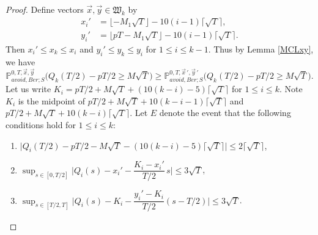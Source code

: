 \begin{proof}
	Define vectors $\vec{x},\vec{y}\in\mathfrak{W}_k$ by
	\begin{align*}
	x_i' &= \lfloor - M_1\sqrt{T} \rfloor - 10(i-1)\lceil\sqrt{T}\rceil,\\
	y_i' &= \lfloor pT - M_1\sqrt{T}\rfloor - 10(i-1)\lceil\sqrt{T}\rceil.
	\end{align*}
	Then $x_i'\leq x_k \leq x_i$ and $y_i' \leq y_k \leq y_i$ for $1\leq i\leq k-1$. Thus by Lemma \ref{MCLxy}, we have
	\begin{equation*}
	\mathbb{P}^{0,T,\vec{x},\vec{y}}_{avoid, Ber; S} \Big(Q_k(T/2) - pT/2 \geq M\sqrt{T}\Big) \geq \mathbb{P}^{0,T,\vec{x}\,',\vec{y}\,'}_{avoid, Ber; S} \Big(Q_k(T/2) - pT/2 \geq M\sqrt{T}\Big).
	\end{equation*}
	Let us write $K_i = pT/2 + M\sqrt{T}+(10(k-i)-5)\lceil\sqrt{T}\rceil$ for $1\leq i\leq k$. Note $K_i$ is the midpoint of $pT/2 + M\sqrt{T} + 10(k-i-1)\lceil\sqrt{T}\rceil$ and $pT/2 + M\sqrt{T}+10(k-i)\lceil\sqrt{T}\rceil$. Let $E$ denote the event that the following conditions hold for $1\leq i\leq k$:
	\begin{enumerate}[label=(\arabic*)]
		
		\item $\big| Q_i(T/2) - pT/2 - M\sqrt{T} - (10(k-i)-5)\lceil\sqrt{T}\rceil \big| \leq 2\lceil\sqrt{T}\rceil$,
		
		\item $\sup_{s\in[0,T/2]} \Big|Q_i(s)-x_i'-\dfrac{K_i-x_i'}{T/2}\,s\Big| \leq 3\sqrt{T}$,
		
		\item $\sup_{s\in[T/2,T]} \Big|Q_i(s)-K_i-\dfrac{y_i'-K_i}{T/2}(s-T/2)\Big| \leq 3\sqrt{T}$.
		

\end{enumerate}
\end{proof}
